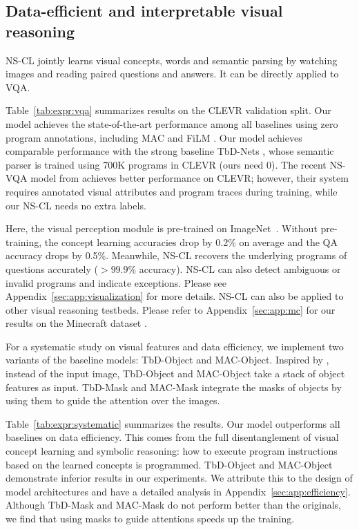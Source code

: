 \documentclass{article} \usepackage{iclr2019_conference,times}
\newcommand{\tbl}[1]{Table~\ref{#1}}
\newcommand{\model}{NS-CL\xspace}
\begin{document}
\subsection{Data-efficient and interpretable visual reasoning}

\model jointly learns visual concepts, words and semantic parsing by watching images and reading paired questions and answers. It can be directly applied to VQA.

\tbl{tab:expr:vqa} summarizes results on the CLEVR validation split. Our model achieves the state-of-the-art performance among all baselines using zero program annotations, including MAC \citep{Hudson2018Compositional} and FiLM \citep{Perez2017Film}. Our model achieves comparable performance with the strong baseline TbD-Nets \citep{Mascharka2018Transparency}, whose semantic parser is trained using 700K programs in CLEVR (ours need 0). The recent NS-VQA model from \cite{kexin} achieves better performance on CLEVR; however, their system requires annotated visual attributes and program traces during training, while our \model needs no extra labels.

Here, the visual perception module is pre-trained on ImageNet~\citep{Deng2009Imagenet}. Without pre-training, the concept learning accuracies drop by 0.2\% on average and the QA accuracy drops by 0.5\%. Meanwhile, \model recovers the underlying programs of questions accurately ($>99.9\%$ accuracy). \model can also detect ambiguous or invalid programs and indicate exceptions. Please see Appendix~\ref{sec:app:visualization} for more details. \model can also be applied to other visual reasoning testbeds. Please refer to Appendix~\ref{sec:app:mc} for our results on the Minecraft dataset \citep{kexin}.

For a systematic study on visual features and data efficiency, we implement two variants of the baseline models: TbD-Object and MAC-Object. Inspired by \citep{Anderson2017BottomUp}, instead of the input image, TbD-Object and MAC-Object take a stack of object features as input. TbD-Mask and MAC-Mask integrate the masks of objects by using them to guide the attention over the images.

Table~\ref{tab:expr:systematic} summarizes the results. Our model outperforms all baselines on data efficiency. This comes from the full disentanglement of visual concept learning and symbolic reasoning: how to execute program instructions based on the learned concepts is programmed. TbD-Object and MAC-Object demonstrate inferior results in our experiments. We attribute this to the design of model architectures and have a detailed analysis in Appendix~\ref{sec:app:efficiency}. Although TbD-Mask and MAC-Mask do not perform better than the originals, we find that using masks to guide attentions speeds up the training. 
\end{document}
